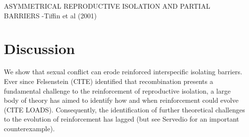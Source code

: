 \documentclass[11pt]{article}
\begin{document}


ASYMMETRICAL REPRODUCTIVE ISOLATION AND PARTIAL BARRIERS
-Tiffin et al (2001)


\section*{Discussion}

We show that sexual conflict can erode reinforced interspecific isolating barriers. 
Ever since Felsenstein (CITE) identified that recombination presents  a fundamental challenge to the reinforcement of reproductive isolation, a large body of theory has aimed to identify how and when reinforcement could evolve (CITE  LOADS). 
Consequently, the identification of further theoretical challenges to the evolution of reinforcement has lagged (but see Servedio for an important counterexample).
\end{document}
